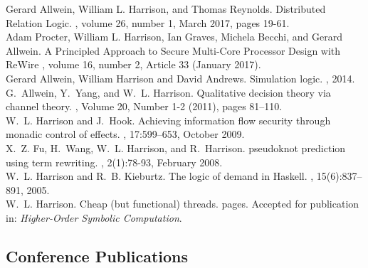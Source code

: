 \documentclass[12pt]{article} %
\begin{document}
Gerard Allwein, William L. Harrison, and Thomas Reynolds.
\newblock Distributed Relation Logic.
, volume 26, number 1, March 2017, pages 19-61.
\\


Adam Procter, William L. Harrison, Ian Graves, Michela Becchi, and Gerard Allwein.
\newblock A Principled Approach to Secure Multi-Core Processor Design with ReWire
, volume 16, number 2, Article 33 (January 2017).
\\

Gerard Allwein, William Harrison and David Andrews.
\newblock Simulation logic.
, 2014.
\\

G.~Allwein, Y.~Yang, and W.~L. Harrison.
\newblock Qualitative decision theory via channel theory.
, Volume 20, Number 1-2 (2011), pages 81--110.
\\


W.~L. Harrison and J.~Hook.
\newblock Achieving information flow security through monadic control of
  effects.
, 17:599--653, October 2009.
\\

X.~Z. Fu, H.~Wang, W.~L. Harrison, and R.~Harrison.
 pseudoknot prediction using term rewriting.
, 2(1):78-93, February 2008.
\\


W.~L. Harrison and R.~B. Kieburtz.
\newblock The logic of demand in {H}askell.
, 15(6):837--891, 2005.
\\


W.~L. Harrison.
\newblock Cheap (but functional) threads.
 pages. Accepted for publication in: {\em Higher-Order Symbolic Computation}. 

\subsection*{Conference Publications}
\end{document}
